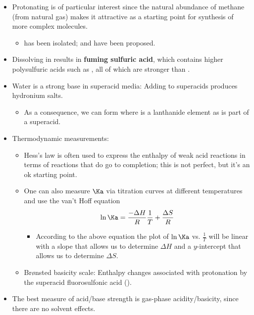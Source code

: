 \documentclass[../notes.tex]{subfiles}
\begin{document}
\begin{itemize}
    \item Protonating  is of particular interest since the natural abundance of methane (from natural gas) makes it attractive as a starting point for synthesis of more complex molecules.
    \begin{itemize}
        \item {} has been isolated;  and  have been proposed.
    \end{itemize}
    \item Dissolving  in  results in \textbf{fuming sulfuric acid}, which contains higher polysulfuric acids such as , all of which are stronger than .
    \item Water is a strong base in superacid media: Adding  to superacids produces hydronium salts.
    \begin{itemize}
        \item As a consequence, we can form  where  is a lanthanide element as  is part of a superacid.
    \end{itemize}
    \item Thermodynamic measurements:
    \begin{itemize}
        \item Hess's law is often used to express the enthalpy of weak acid reactions in terms of reactions that do go to completion; this is not perfect, but it's an ok starting point.
        \item One can also measure $\Ka$ via titration curves at different temperatures and use the van't Hoff equation
        \begin{equation*}
            \ln\Ka = \frac{-\Delta H}{R}\frac{1}{T}+\frac{\Delta S}{R}
        \end{equation*}
        \begin{itemize}
            \item According to the above equation the plot of $\ln\Ka$ vs. $\frac{1}{T}$ will be linear with a slope that allows us to determine $\Delta H$ and a $y$-intercept that allows us to determine $\Delta S$.
        \end{itemize}
        \item Br{\o}nsted basicity scale: Enthalpy changes associated with protonation by the superacid fluorosulfonic acid ().
    \end{itemize}
    \item The best measure of acid/base strength is gas-phase acidity/basicity, since there are no solvent effects.

\end{itemize}
\end{document}

